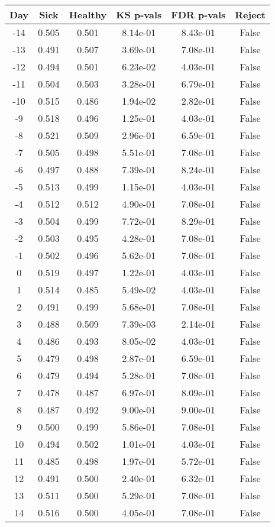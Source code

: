 \begin{tabular}{c|c|c|c|c|c}
Day &  Sick & Healthy &  KS p-vals & FDR p-vals & Reject\\
\hline
-14 & 0.505 &   0.501 &   8.14e-01 &   8.43e-01 &  False\\
-13 & 0.491 &   0.507 &   3.69e-01 &   7.08e-01 &  False\\
-12 & 0.494 &   0.501 &   6.23e-02 &   4.03e-01 &  False\\
-11 & 0.504 &   0.503 &   3.28e-01 &   6.79e-01 &  False\\
-10 & 0.515 &   0.486 &   1.94e-02 &   2.82e-01 &  False\\
 -9 & 0.518 &   0.496 &   1.25e-01 &   4.03e-01 &  False\\
 -8 & 0.521 &   0.509 &   2.96e-01 &   6.59e-01 &  False\\
 -7 & 0.505 &   0.498 &   5.51e-01 &   7.08e-01 &  False\\
 -6 & 0.497 &   0.488 &   7.39e-01 &   8.24e-01 &  False\\
 -5 & 0.513 &   0.499 &   1.15e-01 &   4.03e-01 &  False\\
 -4 & 0.512 &   0.512 &   4.90e-01 &   7.08e-01 &  False\\
 -3 & 0.504 &   0.499 &   7.72e-01 &   8.29e-01 &  False\\
 -2 & 0.503 &   0.495 &   4.28e-01 &   7.08e-01 &  False\\
 -1 & 0.502 &   0.496 &   5.62e-01 &   7.08e-01 &  False\\
  0 & 0.519 &   0.497 &   1.22e-01 &   4.03e-01 &  False\\
  1 & 0.514 &   0.485 &   5.49e-02 &   4.03e-01 &  False\\
  2 & 0.491 &   0.499 &   5.68e-01 &   7.08e-01 &  False\\
  3 & 0.488 &   0.509 &   7.39e-03 &   2.14e-01 &  False\\
  4 & 0.486 &   0.493 &   8.05e-02 &   4.03e-01 &  False\\
  5 & 0.479 &   0.498 &   2.87e-01 &   6.59e-01 &  False\\
  6 & 0.479 &   0.494 &   5.28e-01 &   7.08e-01 &  False\\
  7 & 0.478 &   0.487 &   6.97e-01 &   8.09e-01 &  False\\
  8 & 0.487 &   0.492 &   9.00e-01 &   9.00e-01 &  False\\
  9 & 0.500 &   0.499 &   5.86e-01 &   7.08e-01 &  False\\
 10 & 0.494 &   0.502 &   1.01e-01 &   4.03e-01 &  False\\
 11 & 0.485 &   0.498 &   1.97e-01 &   5.72e-01 &  False\\
 12 & 0.491 &   0.500 &   2.40e-01 &   6.32e-01 &  False\\
 13 & 0.511 &   0.500 &   5.29e-01 &   7.08e-01 &  False\\
 14 & 0.516 &   0.500 &   4.05e-01 &   7.08e-01 &  False\\
\end{tabular}